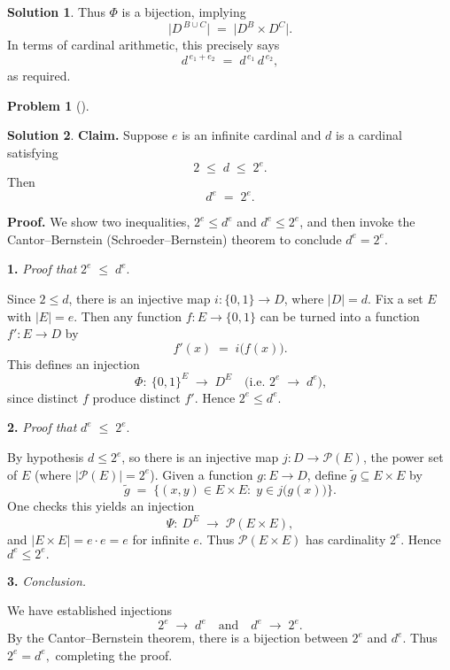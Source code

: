 \documentclass[12pt]{article}
\theoremstyle{definition} %
\newtheorem{solution}{Solution}
\newtheorem{problem}{Problem}
\theoremstyle{plain} %
\begin{document}
\begin{solution}
    \smallskip
    
    \noindent
    Thus $\Phi$ is a bijection, implying
    \[
    \bigl|D^{\,B \cup C}\bigr| \;=\; \bigl|D^B \times D^C\bigr|.
    \]
    In terms of cardinal arithmetic, this precisely says 
    \[
    d^{\,e_1 + e_2} \;=\; d^{\,e_1}\,d^{\,e_2},
    \]
    as required.
     
\end{solution}

\begin{problem}[]
    
\end{problem}
\begin{solution}
    \noindent
\textbf{Claim.}\; Suppose $e$ is an infinite cardinal and $d$ is a cardinal satisfying 
\[
2 \;\le\; d \;\le\; 2^e.
\]
Then 
\[
d^e \;=\; 2^e.
\]

\bigskip

\noindent
\textbf{Proof.} 
We show two inequalities, $2^e \le d^e$ and $d^e \le 2^e$, and then invoke the 
Cantor--Bernstein (Schroeder--Bernstein) theorem to conclude $d^e = 2^e.$

\medskip

\noindent
\textbf{1.} \emph{Proof that }$2^e \;\le\; d^e.$

Since $2 \le d$, there is an injective map $i: \{0,1\} \to D$, where $|D|=d$.  
Fix a set $E$ with $|E|=e$.  
Then any function $f:E \to \{0,1\}$ can be turned into a function $f':E \to D$ by 
\[
f'(x)\;=\;i\bigl(f(x)\bigr).
\]
This defines an injection 
\[
\Phi:\ \{0,1\}^E \;\longrightarrow\; D^E
\quad\text{(i.e.\ }2^e \;\to\; d^e\text{),}
\]
since distinct $f$ produce distinct $f'$.  
Hence $2^e \le d^e.$

\medskip

\noindent
\textbf{2.} \emph{Proof that }$d^e \;\le\; 2^e.$

By hypothesis $d \le 2^e$, so there is an injective map $j: D \to \mathcal{P}(E)$, 
the power set of $E$ (where $|\mathcal{P}(E)|=2^e$).  
Given a function $g:E \to D$, define $\widetilde{g} \subseteq E \times E$ by 
\[
\widetilde{g} \;=\; \bigl\{(x,y)\in E\times E:\; y \in j\bigl(g(x)\bigr)\bigr\}.
\]
One checks this yields an injection 
\[
\Psi:\ D^E \;\longrightarrow\; \mathcal{P}(E\times E),
\]
and $|E \times E| = e\cdot e = e$ for infinite $e$.  
Thus $\mathcal{P}(E \times E)$ has cardinality $2^e$.  
Hence $d^e \le 2^e.$

\medskip

\noindent
\textbf{3.} \emph{Conclusion.}

We have established injections 
\[
2^e \;\longrightarrow\; d^e 
\quad\text{and}\quad
d^e \;\longrightarrow\; 2^e.
\]
By the Cantor--Bernstein theorem, there is a bijection between $2^e$ and $d^e$.  
Thus $2^e = d^e,$ completing the proof.

\end{solution}
\end{document}
